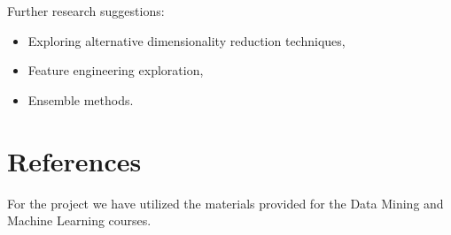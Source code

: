 \documentclass[11pt,a4paper]{article}\usepackage[]{graphicx}\usepackage[]{xcolor}
\begin{document}
Further research suggestions:
\begin{itemize}
\item Exploring alternative dimensionality reduction techniques,
\item Feature engineering exploration,
\item Ensemble methods.
\end{itemize}






	\section*{References}
	For the project we have utilized the materials provided for the Data Mining and Machine Learning courses. 
	
\end{document}
